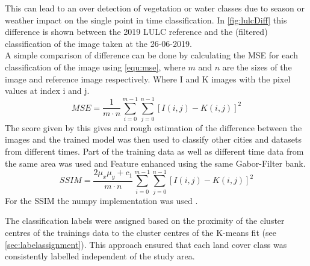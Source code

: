 \documentclass[12pt,a4paper, english,twoside]{scrartcl}
\begin{document}
      This can lead to an over detection of vegetation or water classes due to season or weather impact on the single point in time classification.
      In \cref{fig:lulcDiff} this difference is shown between the 2019 \gls{LULC} reference and the (filtered) classification of the image taken at the 26-06-2019. \\ 
      A simple comparison of difference can be done by calculating the \gls{MSE} for each classification of the image using \cref{equ:mse}, where  $m$ and $n$ are the sizes of the image and reference image respectively. Where I and K images with the pixel values at index i and j. 
      \begin{equation}\label{equ:mse}
        MSE = \frac{1}{m\cdot n}\sum_{i=0}^{m-1} \sum_{j=0}^{n-1} \left[I(i,j)-K(i,j)\right]^2
      \end{equation}
      The score given by this gives and rough estimation of the difference between the images and the trained model was then used to classify other cities and datasets from different times. 
      Part of the training data as well as different time data from the same area was used and Feature enhanced using the same Gabor-Filter bank.
      \begin{equation}\label{equ:ssim}
        SSIM = \frac{2\mu_x\mu_y+c_1}{m\cdot n}\sum_{i=0}^{m-1} \sum_{j=0}^{n-1} \left[I(i,j)-K(i,j)\right]^2
      \end{equation}
      For the SSIM the numpy implementation was used \autocite{harris2020array}.



      \noindent
      The classification labels were assigned based on the proximity of the cluster centres of the trainings data to the cluster centres of the K-means fit (see \cref{sec:labelassignment}).
      This approach ensured that each land cover class was consistently labelled independent of the study area.\\
\end{document}
